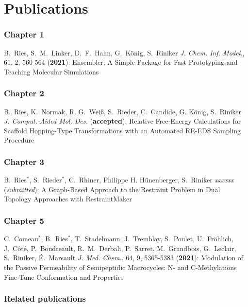 \chapter{Publications}
\subsection*{Chapter 1}
B.\ Ries, S.\ M.\ Linker, D.\ F.\ Hahn, G.\ K\"onig, S.\ Riniker {\em J. Chem. Inf. Model.}, 61, 2, 560-564 ({\bf 2021}): 
Ensembler: A Simple Package for Fast Prototyping and Teaching Molecular Simulations

\subsection*{Chapter 2}
B.\ Ries, K.\ Normak, R. G.\ Wei\ss, S.\ Rieder, C.\ Candide, G. K\"onig, S.\ Riniker {\em J. Comput.-Aided Mol. Des.} ({\bf accepted}): 
Relative Free-Energy Calculations for Scaffold Hopping-Type Transformations with an Automated RE-EDS Sampling Procedure

\subsection*{Chapter 3}
B.\ Ries$^*$, S.\ Rieder$^*$, C.\ Rhiner, Philippe H. H\"unenberger, S.\ Riniker {\em xxxxxx} ({\em submitted}):
A Graph-Based Approach to the Restraint Problem in Dual Topology Approaches with RestraintMaker

\subsection*{Chapter 5}
C.\ Comeau$^*$, B.\ Ries$^*$, T.\ Stadelmann, J.\ Tremblay, S.\ Poulet, U.\ Fröhlich, J.\ Côté, P.\ Boudreault, R.\ M.\ Derbali, P.\ Sarret, M.\ Grandbois, G.\ Leclair, S.\ Riniker, É.\ Marsault {\em J. Med. Chem.}, 64, 9, 5365-5383 ({\bf 2021}):
Modulation of the Passive Permeability of Semipeptidic Macrocycles: N- and C-Methylations Fine-Tune Conformation and Properties



\subsection*{Related publications}

